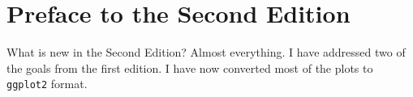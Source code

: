 
\cleardoublepage
{}
{}

\chapter*{Preface to the Second Edition}

What is new in the Second Edition?  Almost everything.  I have addressed two of the goals from the first edition.  I have now converted most of the plots to \texttt{ggplot2} format. 
